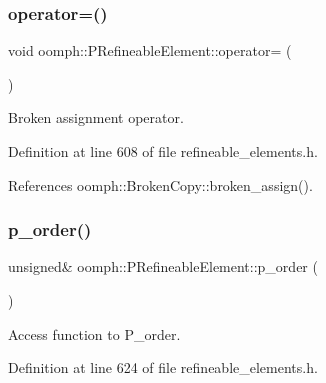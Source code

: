 \subsubsection{\texorpdfstring{operator=()}{operator=()}}
{\footnotesize\ttfamily void oomph\+::\+P\+Refineable\+Element\+::operator= (\begin{DoxyParamCaption}\item[{const \hyperlink{classoomph_1_1PRefineableElement}{P\+Refineable\+Element} \&}]{ }\end{DoxyParamCaption})\hspace{0.3cm}{\ttfamily [inline]}}



Broken assignment operator. 



Definition at line 608 of file refineable\+\_\+elements.\+h.



References oomph\+::\+Broken\+Copy\+::broken\+\_\+assign().

\mbox{\label{classoomph_1_1PRefineableElement_a399d686caa2f65fff9c825d1ff55f053}} 
\subsubsection{\texorpdfstring{p\+\_\+order()}{p\_order()}\hspace{0.1cm}{\footnotesize\ttfamily [1/2]}}
{\footnotesize\ttfamily unsigned\& oomph\+::\+P\+Refineable\+Element\+::p\+\_\+order (\begin{DoxyParamCaption}{ }\end{DoxyParamCaption})\hspace{0.3cm}{\ttfamily [inline]}}



Access function to P\+\_\+order. 



Definition at line 624 of file refineable\+\_\+elements.\+h.



